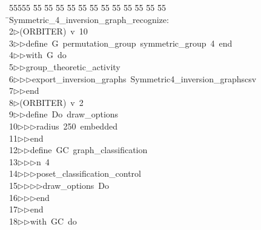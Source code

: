 %
%
\begin{tabbing}
55555 \= 55 \= 55 \= 55 \= 55 \= 55 \= 55 \= 55 \= 55 \= 55 \= 55 \= 55 \= 55 \= \>Symmetric\_4\_inversion\_graph\_recognize:\\[0pt]
2\>$\triangleright$\>(ORBITER)\ v\ 10\ \\[0pt]
3\>$\triangleright$\>$\triangleright$\>define\ G\ permutation\_group\ symmetric\_group\ 4\ end\ \\[0pt]
4\>$\triangleright$\>$\triangleright$\>with\ G\ do\ \\[0pt]
5\>$\triangleright$\>$\triangleright$\>group\_theoretic\_activity\ \\[0pt]
6\>$\triangleright$\>$\triangleright$\>$\triangleright$\>export\_inversion\_graphs\ Symmetric4\_inversion\_graphscsv\ \\[0pt]
7\>$\triangleright$\>$\triangleright$\>end\\[0pt]
8\>$\triangleright$\>(ORBITER)\ v\ 2\ \\[0pt]
9\>$\triangleright$\>$\triangleright$\>define\ Do\ draw\_options\ \\[0pt]
10\>$\triangleright$\>$\triangleright$\>$\triangleright$\>radius\ 250\ embedded\ \\[0pt]
11\>$\triangleright$\>$\triangleright$\>end\ \\[0pt]
12\>$\triangleright$\>$\triangleright$\>define\ GC\ graph\_classification\ \\[0pt]
13\>$\triangleright$\>$\triangleright$\>$\triangleright$\>n\ 4\ \\[0pt]
14\>$\triangleright$\>$\triangleright$\>$\triangleright$\>poset\_classification\_control\ \\[0pt]
15\>$\triangleright$\>$\triangleright$\>$\triangleright$\>$\triangleright$\>draw\_options\ Do\ \\[0pt]
16\>$\triangleright$\>$\triangleright$\>$\triangleright$\>end\ \\[0pt]
17\>$\triangleright$\>$\triangleright$\>end\ \\[0pt]
18\>$\triangleright$\>$\triangleright$\>with\ GC\ do\ \\[0pt]

\end{tabbing}
